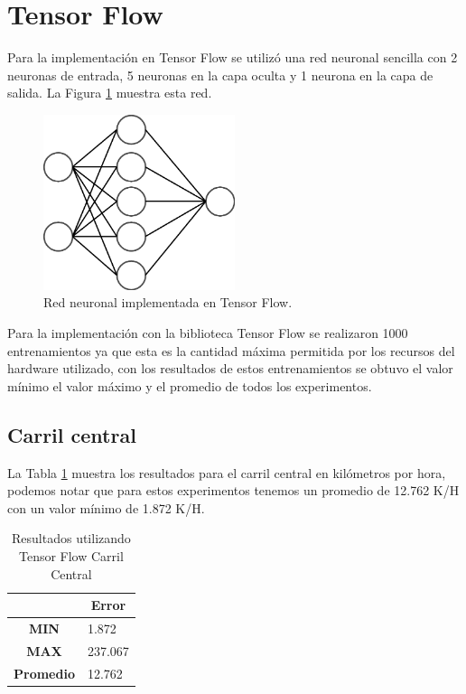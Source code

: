 \section{Tensor Flow}

Para la implementación en Tensor Flow se utilizó una red neuronal sencilla con 2 neuronas de entrada, 5 neuronas en la capa oculta y 1 neurona en la capa de salida. La Figura \ref{fig:RedTF} muestra esta red.

\begin{figure}[H]
    \centering
    \includegraphics[width=0.5\textwidth]{Resultados/imgs/RedTF.png}
    \caption{Red neuronal implementada en Tensor Flow.}
    \label{fig:RedTF}
\end{figure}

Para la implementación con la biblioteca Tensor Flow se realizaron 1000 entrenamientos ya que esta es la cantidad máxima permitida por los recursos del hardware utilizado, con los resultados de estos entrenamientos se obtuvo el valor mínimo el valor máximo y el promedio de todos los experimentos.

\subsection{Carril central}

La Tabla \ref{tab:resultadosTFCCentral} muestra los resultados para el carril central en kilómetros por hora, podemos notar que para estos experimentos tenemos un promedio de 12.762 K/H con un valor mínimo de 1.872 K/H.


\begin{table}[H]
    \centering
    \caption{Resultados utilizando Tensor Flow Carril Central}
    \label{tab:resultadosTFCCentral}
    \begin{tabular}{|c|l|} \hline

    & \multicolumn{1}{c|}{\textbf{Error}} \\ \hline
    \textbf{MIN} & 1.872 \\ \hline
    \textbf{MAX} & 237.067 \\ \hline
    \textbf{Promedio} & 12.762 \\ \hline
    \end{tabular}
\end{table}


